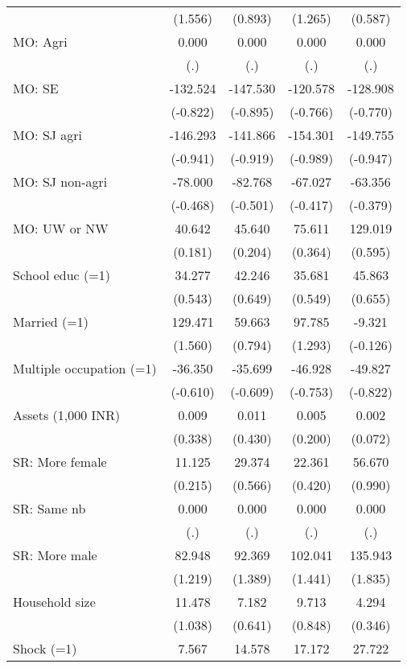 \begin{table}[htbp]
{\begin{tabular}{lcccc}
          & (1.556) & (0.893) & (1.265) & (0.587) \\
    MO: Agri & 0.000 & 0.000 & 0.000 & 0.000 \\
          & (.)   & (.)   & (.)   & (.) \\
    MO: SE & -132.524 & -147.530 & -120.578 & -128.908 \\
          & (-0.822) & (-0.895) & (-0.766) & (-0.770) \\
    MO: SJ agri & -146.293 & -141.866 & -154.301 & -149.755 \\
          & (-0.941) & (-0.919) & (-0.989) & (-0.947) \\
    MO: SJ non-agri & -78.000 & -82.768 & -67.027 & -63.356 \\
          & (-0.468) & (-0.501) & (-0.417) & (-0.379) \\
    MO: UW or NW & 40.642 & 45.640 & 75.611 & 129.019 \\
          & (0.181) & (0.204) & (0.364) & (0.595) \\
    School educ (=1) & 34.277 & 42.246 & 35.681 & 45.863 \\
          & (0.543) & (0.649) & (0.549) & (0.655) \\
    Married (=1) & 129.471 & 59.663 & 97.785 & -9.321 \\
          & (1.560) & (0.794) & (1.293) & (-0.126) \\
    Multiple occupation (=1) & -36.350 & -35.699 & -46.928 & -49.827 \\
          & (-0.610) & (-0.609) & (-0.753) & (-0.822) \\
    Assets (1,000 INR) & 0.009 & 0.011 & 0.005 & 0.002 \\
          & (0.338) & (0.430) & (0.200) & (0.072) \\
    SR: More female & 11.125 & 29.374 & 22.361 & 56.670 \\
          & (0.215) & (0.566) & (0.420) & (0.990) \\
    SR: Same nb & 0.000 & 0.000 & 0.000 & 0.000 \\
          & (.)   & (.)   & (.)   & (.) \\
    SR: More male & 82.948 & 92.369 & 102.041 & 135.943 \\
          & (1.219) & (1.389) & (1.441) & (1.835) \\
    Household size & 11.478 & 7.182 & 9.713 & 4.294 \\
          & (1.038) & (0.641) & (0.848) & (0.346) \\
    Shock (=1) & 7.567 & 14.578 & 17.172 & 27.722 \\

\end{tabular}}
\end{table}
